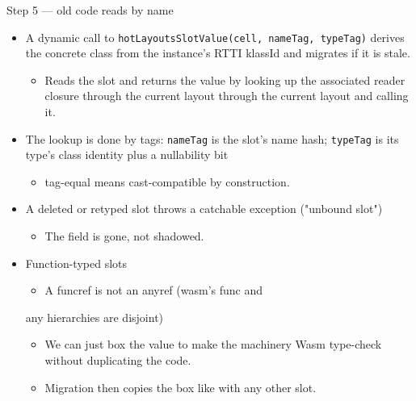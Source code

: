 \documentclass[10pt,presentation]{beamer}
\begin{document}
\begin{frame}[label={sec:org6fec78e},fragile]{Step 5 — old code reads by name}
 \begin{itemize}
\item A dynamic call to \texttt{hotLayoutsSlotValue(cell, nameTag, typeTag)}
derives the \alert{concrete} class from the instance's RTTI klassId and
migrates if it is stale.
\begin{itemize}
\item Reads the slot and returns the value by looking up the associated
reader closure through the current layout through the current
layout and calling it.
\end{itemize}
\item The lookup is done by tags: \texttt{nameTag} is the slot's name hash;
\texttt{typeTag} is its type's class identity plus a nullability bit
\begin{itemize}
\item tag-equal means cast-compatible by construction.
\end{itemize}
\item A deleted or retyped slot \alert{throws a catchable exception} ("unbound
slot")
\begin{itemize}
\item The field is gone, not shadowed.
\end{itemize}
\item Function-typed slots
\begin{itemize}
\item A funcref is not an anyref (wasm's func and
\end{itemize}
any hierarchies are disjoint)
\begin{itemize}
\item We can just box the value to make the machinery Wasm type-check
without duplicating the code.
\item Migration then copies the box like with any other slot.
\end{itemize}
\end{itemize}
\end{frame}
\end{document}
